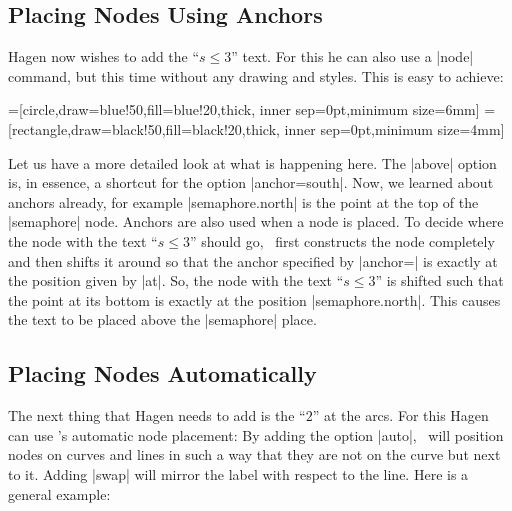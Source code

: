 \subsection{Placing Nodes Using Anchors}

Hagen now wishes to add the ``$s \le 3$'' text. For this he can also
use a |node| command, but this time without any drawing and styles.
This is easy to achieve:

{
=[circle,draw=blue!50,fill=blue!20,thick,
                   inner sep=0pt,minimum size=6mm]
=[rectangle,draw=black!50,fill=black!20,thick,
                        inner sep=0pt,minimum size=4mm]
\begin{codeexample}[]
\end{codeexample}
}

Let us have a more detailed look at what is happening here. The
|above| option is, in essence, a shortcut for the option
|anchor=south|. Now, we learned about anchors already, for example
|semaphore.north| is the point at the top of the |semaphore|
node. Anchors are also used when a node is placed. To decide where the
node with the text ``$s\le 3$'' should go, \tikzname\ first constructs
the node completely and then shifts it around so that the anchor
specified by |anchor=| is exactly at the position given by |at|. So,
the node with the text ``$s \le 3$'' is shifted such that the point at
its bottom is exactly at the position |semaphore.north|. This causes
the text to be placed above the |semaphore| place.



\subsection{Placing Nodes Automatically}

The next thing that Hagen needs to add is the ``$2$'' at the arcs. For
this Hagen can use \tikzname's automatic node placement: By adding the
option |auto|, \tikzname\ will position nodes on curves and lines in
such a way that they are not on the curve but next to it. Adding
|swap| will mirror the label with respect to the line. Here is a
general example:

